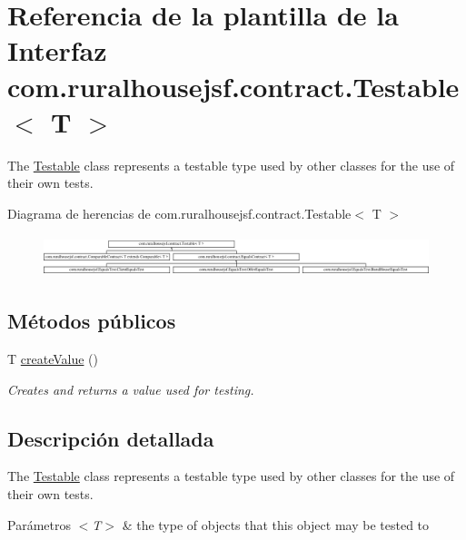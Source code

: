 \hypertarget{interfacecom_1_1ruralhousejsf_1_1contract_1_1_testable}{}\section{Referencia de la plantilla de la Interfaz com.\+ruralhousejsf.\+contract.\+Testable$<$ T $>$}
\label{interfacecom_1_1ruralhousejsf_1_1contract_1_1_testable}


The \mbox{\hyperlink{interfacecom_1_1ruralhousejsf_1_1contract_1_1_testable}{Testable}} class represents a testable type used by other classes for the use of their own tests.  


Diagrama de herencias de com.\+ruralhousejsf.\+contract.\+Testable$<$ T $>$\begin{figure}[H]
\begin{center}
\leavevmode
\includegraphics[height=1.212121cm]{d8/db5/interfacecom_1_1ruralhousejsf_1_1contract_1_1_testable}
\end{center}
\end{figure}
\subsection*{Métodos públicos}
\begin{DoxyCompactItemize}
\item 
T \mbox{\hyperlink{interfacecom_1_1ruralhousejsf_1_1contract_1_1_testable_ae4546a381488faaba1ef7c0f8688de9c}{create\+Value}} ()
\begin{DoxyCompactList}\small\item\em Creates and returns a value used for testing. \end{DoxyCompactList}\end{DoxyCompactItemize}


\subsection{Descripción detallada}
The \mbox{\hyperlink{interfacecom_1_1ruralhousejsf_1_1contract_1_1_testable}{Testable}} class represents a testable type used by other classes for the use of their own tests. 


\begin{DoxyParams}{Parámetros}
{\em $<$\+T$>$} & the type of objects that this object may be tested to \\
\hline
\end{DoxyParams}



